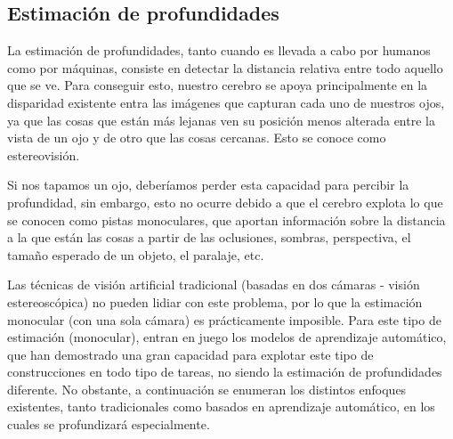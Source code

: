 \documentclass[a4paper, 11pt]{article}
\begin{document}



\subsection{Estimación de profundidades}
La estimación de profundidades, tanto cuando es llevada a cabo por humanos como por máquinas, consiste en detectar la distancia relativa entre todo aquello que se ve. Para conseguir esto, nuestro cerebro se apoya principalmente en la disparidad existente entra las imágenes que capturan cada uno de nuestros ojos, ya que las cosas que están más lejanas ven su posición menos alterada entre la vista de un ojo y de otro que las cosas cercanas. Esto se conoce como estereovisión.

Si nos tapamos un ojo, deberíamos perder esta capacidad para percibir la profundidad, sin embargo, esto no ocurre debido a que el cerebro explota lo que se conocen como pistas monoculares, que aportan información sobre la distancia a la que están las cosas a partir de las oclusiones, sombras, perspectiva, el tamaño esperado de un objeto, el paralaje, etc.

Las técnicas de visión artificial tradicional (basadas en dos cámaras - visión estereoscópica) no pueden lidiar con este problema, por lo que la estimación monocular (con una sola cámara) es prácticamente imposible. Para este tipo de estimación (monocular), entran en juego los modelos de aprendizaje automático, que han demostrado una gran capacidad para explotar este tipo de construcciones en todo tipo de tareas, no siendo la estimación de profundidades diferente. No obstante, a continuación se enumeran los distintos enfoques existentes, tanto tradicionales como basados en aprendizaje automático, en los cuales se profundizará especialmente.

\end{document}
